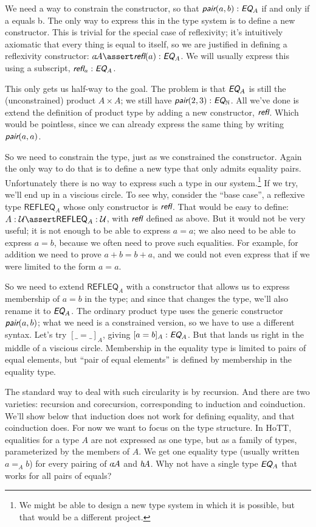 \documentclass{article}
\begin{document}
We need a way to constrain the constructor, so that
\(\pair(a,b):\EQ_A\) if and only if a equals b. The only way to
express this in the type system is to define a new constructor. This
is trivial for the special case of reflexivity; it's intuitively
axiomatic that every thing is equal to itself, so we are justified in
defining a reflexivity constructor: \(a\type A\linfer\refl(a):\EQ_A\).
We will usually express this using a subscript, \(\refl_a:\EQ_A\).

This only gets us half-way to the goal. The problem is that \(\EQ_A\)
is still the (unconstrained) product \(A\times A\); we still have
\(\pair(2,3):\EQ_{\Nat}\). All we've done is extend the definition of
product type by adding a new constructor, \(\refl\). Which would be
pointless, since we can already express the same thing by writing
\(\pair(a,a)\).

So we need to constrain the type, just as we constrained the
constructor. Again the only way to do that is to define a new type
that only admits equality pairs. Unfortunately there is no way to
express such a type in our system.\footnote{We might be able to design
a new type system in which it is possible, but that would be a
different project.} If we try, we'll end up in a viscious circle. To
see why, consider the ``base case'', a reflexive type
\(\textsf{REFLEQ}_A\) whose only constructor is \(\refl\). That
would be easy to define: \(A:\Univ\linfer \textsf{REFLEQ}_A:\Univ\),
with \(\refl\) defined as above. But it would not be very useful; it
is not enough to be able to express \(a=a\); we also need to be able
to express \(a=b\), because we often need to prove such equalities.
For example, for addition we need to prove \(a+b = b+a\), and we could
not even express that if we were limited to the form \(a=a\).

So we need to extend \(\textsf{REFLEQ}_A\) with a constructor that
allows us to express membership of \(a=b\) in the type; and since that
changes the type, we'll also rename it to \(\EQ_A\). The ordinary
product type uses the generic constructor \(\pair(a,b)\); what we need
is a constrained version, so we have to use a different syntax. Let's
try \([\_=\_]_A\), giving \([a=b]_A:\EQ_A\). But that lands us right
in the middle of a viscious circle. Membership in the equality type is
limited to pairs of equal elements, but ``pair of equal elements'' is
defined by membership in the equality type.

The standard way to deal with such circularity is by recursion. And
there are two varieties: recursion and corecursion, corresponding to
induction and coinduction. We'll show below that induction does not
work for defining equality, and that coinduction does. For now we want
to focus on the type structure. In HoTT, equalities for a type \(A\)
are not expressed as one type, but as a family of types, parameterized
by the members of \(A\). We get one equality type (usually written
\(a=_A b\)) for every pairing of \(a\hspace{-2pt}\mathpunct{:}\hspace{-3pt} A\) and \(b\hspace{-2pt}\mathpunct{:}\hspace{-3pt} A\). Why not
have a single type \(\EQ_A\) that works for all pairs of equals?
\end{document}

